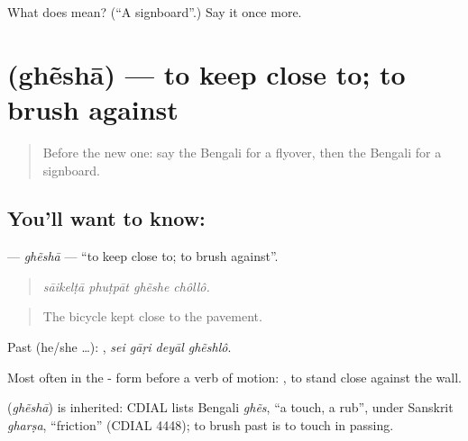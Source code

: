 \begin{tcolorbox}[breakable,colback=teal!4,colframe=teal!35!black,title={Before you move on}]
What does  mean? (\textquotedblleft{}A signboard\textquotedblright{}.) Say it once more.
\end{tcolorbox}
\section[\texorpdfstring{\bn{ঘেঁষা} (ghẽshā)}{ঘেঁষা (ghẽshā)}]{ (ghẽshā) — to keep close to; to brush against}

\label{lesson:BN-C392-ghesha}



\begin{quote}
Before the new one: say the Bengali for a flyover, then the Bengali for a signboard.
\end{quote}

\subsection*{You'll want to know: }
\textbf{} — \emph{ghẽshā} — \textquotedblleft{}to keep close to; to brush against\textquotedblright{}.

\begin{quote}
   
\end{quote}

\begin{quote}
\emph{sāikelṭā phuṭpāt ghẽshe chôllô.}
\end{quote}

\begin{quote}
The bicycle kept close to the pavement.
\end{quote}

Past (he/she …):    , \emph{sei gāṛi deyāl ghẽshlô}.

Most often in the - form before a verb of motion:   , to stand close against the wall.

\begin{cousinweb}
\textbf{} (\emph{ghẽshā}) is inherited: CDIAL lists Bengali \emph{ghẽs}, \textquotedblleft{}a touch, a rub\textquotedblright{}, under Sanskrit \emph{gharṣa}, \textquotedblleft{}friction\textquotedblright{} (CDIAL 4448); to brush past is to touch in passing.
\end{cousinweb}

